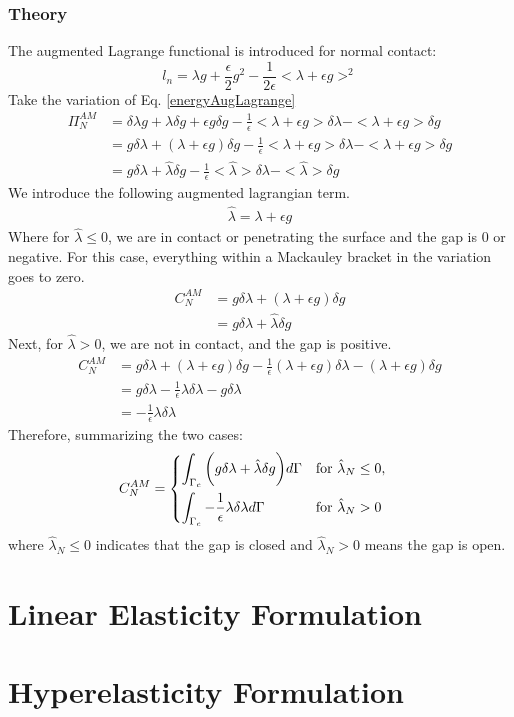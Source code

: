 \documentclass[12pt,3p]{article}
\numberwithin{equation}{section}
\begin{document}
\subsubsection{Theory}
The augmented Lagrange functional is introduced for normal contact: 
\begin{equation}\label{energyAugLagrange}
l_n = \lambda g + \frac{\epsilon}{2} g^2 - \frac{1}{2 \epsilon} <\lambda + \epsilon g>^2 
\end{equation}
Take the variation of Eq. \ref{energyAugLagrange}
\begin{align*}
\Pi_N^{AM} &= \delta \lambda g + \lambda \delta g + \epsilon g \delta g - \frac{1}{\epsilon}  <\lambda +  \epsilon g> \delta \lambda - <\lambda +  \epsilon g> \delta g \\
		&= g \delta \lambda + (\lambda + \epsilon g) \delta g - \frac{1}{\epsilon}  <\lambda +  \epsilon g> \delta \lambda - <\lambda +  \epsilon g> \delta g \\
		&= g \delta \lambda + \hat{\lambda} \delta g - \frac{1}{\epsilon}  <\hat{\lambda}> \delta \lambda - <\hat{\lambda}> \delta g
\end{align*}
We introduce the following augmented lagrangian term.
\begin{align*}
\hat{\lambda} = \lambda + \epsilon g
\end{align*}
Where for $\hat{\lambda} \leq 0$, we are in contact or penetrating the surface and the gap is 0 or negative. For this case, everything within a Mackauley bracket in the variation goes to zero. 
\begin{align*}
C_N^{AM} &= g \delta \lambda + (\lambda + \epsilon g) \delta g \\
		&= g \delta \lambda + \hat{\lambda} \delta g 
\end{align*}
Next, for $\hat{\lambda} > 0$, we are not in contact, and the gap is positive. 
\begin{align*}
C_N^{AM} &= g \delta \lambda + (\lambda + \epsilon g) \delta g - \frac{1}{\epsilon} (\lambda +  \epsilon g) \delta \lambda - (\lambda +  \epsilon g) \delta g \\
		&= g \delta \lambda - \frac{1}{\epsilon} \lambda \delta \lambda - g \delta \lambda \\
		&= - \frac{1}{\epsilon} \lambda \delta \lambda
\end{align*}
Therefore, summarizing the two cases: 
\begin{align}\label{659}
C_{N}^{AM} &= 
\begin{dcases}
    \int_{\Gamma_c} \bigg( g \delta \lambda + \hat{\lambda} \delta g \bigg) d \Gamma & \text{for } \hat{\lambda}_N \leq 0, \\
    \int_{\Gamma_c} -\frac{1}{\epsilon} \lambda \delta \lambda d \Gamma               & \text{for } \hat{\lambda}_N > 0
\end{dcases}
\end{align}
where $ \hat{\lambda}_N \leq 0$ indicates that the gap is closed and $\hat{\lambda}_N > 0$ means the gap is open. 

\section{Linear Elasticity Formulation}

\section{Hyperelasticity Formulation}
\end{document}
